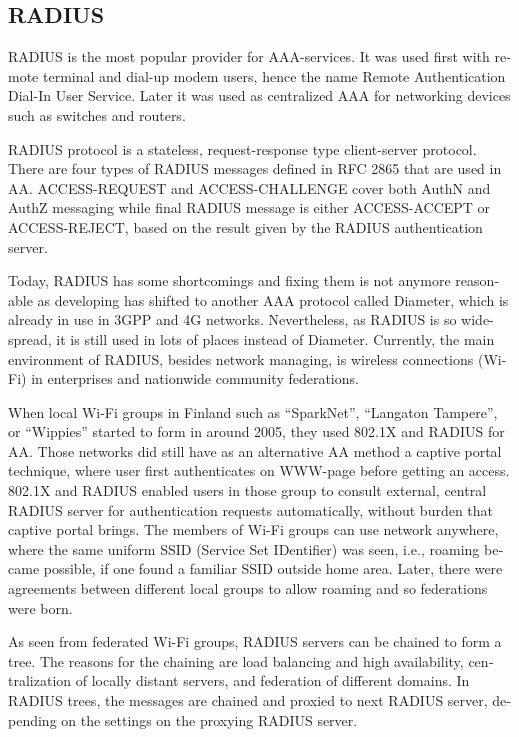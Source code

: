\documentclass[12pt,a4paper,english]{tutthesis}
\begin{document}
\begin{otherlanguage}{english}
\section{RADIUS}
\label{sec-2-2}
\label{sec:radius}
RADIUS is the most popular provider for 
AAA-services\cite[p.75]{radius-popular}.  It was used first with remote terminal
and dial-up modem users, hence the name Remote Authentication Dial-In
User Service. Later it was used as centralized AAA for networking
devices such as switches and routers.  










RADIUS protocol is a stateless, request-response type client-server
protocol. 
There are four types of RADIUS messages defined in RFC 2865 that are
used in AA. ACCESS-REQUEST and ACCESS-CHALLENGE cover both AuthN and
AuthZ messaging while final RADIUS message is either
ACCESS-ACCEPT or ACCESS-REJECT, based on the
result given by the RADIUS authentication server.

Today, RADIUS has some shortcomings and fixing them is not anymore
reasonable as developing has shifted to another AAA protocol called
Diameter, which is already in use in 3GPP and 4G
networks\cite{diameter}.  Nevertheless, as RADIUS is so wide-spread,
it is still used in lots of places instead of Diameter.  Currently,
the main environment of RADIUS, besides network managing, is wireless
connections (Wi-Fi) in enterprises and nationwide community
federations.


When local Wi-Fi groups in Finland such as ``SparkNet'', ``Langaton
Tampere'', or ``Wippies'' started to form in around 2005, they used
802.1X and RADIUS for AA. Those networks did still have as an
alternative AA method a captive portal technique, where user
first authenticates on WWW-page before getting an access.  802.1X and
RADIUS enabled users in those group to consult external,
central RADIUS server for authentication requests automatically,
without burden that captive portal brings.  The members of Wi-Fi
groups can use network anywhere, where the same uniform SSID (Service
Set IDentifier) was seen, i.e., roaming
became possible, if one found a familiar SSID outside home area.  Later, there were agreements between different local groups
to allow roaming and so federations were born.

As seen from federated Wi-Fi groups, RADIUS servers can be chained to
form a tree. The reasons for the chaining are load balancing and high
availability, centralization of locally distant servers, and
federation of different domains. In RADIUS trees, the messages are
chained and proxied to next RADIUS server, depending on the settings
on the proxying RADIUS server.



\end{otherlanguage}
\end{document}
